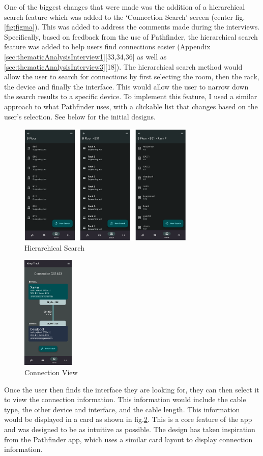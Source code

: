 \documentclass [11pt,a4paper]{article}
\begin{document}
One of the biggest changes that were made was the addition of a hierarchical search feature which was added to the `Connection Search' screen (center fig.\ref{fig:figma}). This was added to address the comments made during the interviews. Specifically, based on feedback from the use of Pathfinder, the hierarchical search feature was added to help users find connections easier (Appendix \ref{sec:thematicAnalysisInterview1}[33,34,36] as well as \ref{sec:thematicAnalysisInterview3}[18]). The hierarchical search method would allow the user to search for connections by first selecting the room, then the rack, the device and finally the interface. This would allow the user to narrow down the search results to a specific device. To implement this feature, I used a similar approach to what Pathfinder \cite{PathfinderMobile} uses, with a clickable list that changes based on the user's selection. See below for the initial designs.
\begin{figure}[H]
    \centering
    \includegraphics[width=0.75\textwidth]{images/heirarchy_search.png}
    \caption{Hierarchical Search}
    \label{fig:hierarchical_search}
\end{figure}
\begin{figure}
    \centering
    \includegraphics[width=0.22\textwidth]{images/connection_display.png}
    \caption{Connection View}
    \label{fig:connection_card}
\end{figure}
Once the user then finds the interface they are looking for, they can then select it to view the connection information. This information would include the cable type, the other device and interface, and the cable length. This information would be displayed in a card as shown in fig.\ref{fig:connection_card}. This is a core feature of the app and was designed to be as intuitive as possible. The design has taken inspiration from the Pathfinder app, which uses a similar card layout to display connection information.
\end{document}
